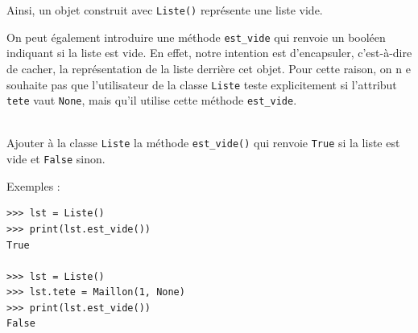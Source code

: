 \documentclass[a4paper,17pt]{extarticle}
\newenvironment{eleve}%
{\begin{activite}\color{noiramu}\\[-0.5cm]}
{\end{activite}}
\begin{document}
    Ainsi, un objet construit avec \texttt{Liste()} représente une liste
vide.

On peut également introduire une méthode \texttt{est\_vide} qui renvoie
un booléen indiquant si la liste est vide. En effet, notre intention est
d'encapsuler, c'est-à-dire de cacher, la représentation de la liste
derrière cet objet. Pour cette raison, on n e souhaite pas que
l'utilisateur de la classe \texttt{Liste} teste explicitement si
l'attribut \texttt{tete} vaut \texttt{None}, mais qu'il utilise cette
méthode \texttt{est\_vide}.
\begin{eleve}
    Ajouter à la classe \texttt{Liste} la méthode \texttt{est\_vide()} qui
renvoie \texttt{True} si la liste est vide et \texttt{False} sinon.

Exemples :

\begin{verbatim}
>>> lst = Liste()
>>> print(lst.est_vide())
True

>>> lst = Liste()
>>> lst.tete = Maillon(1, None)
>>> print(lst.est_vide())
False
\end{verbatim}
        
        \end{eleve}
\end{document}
